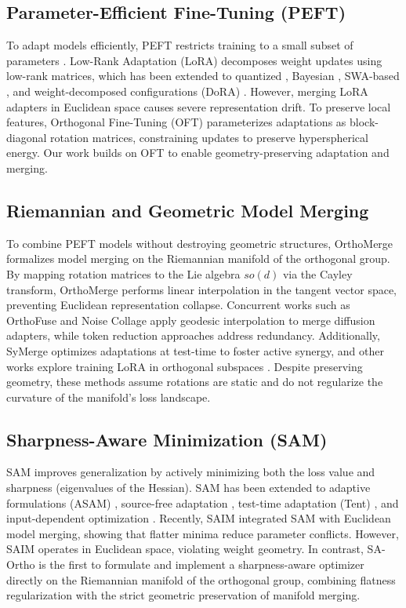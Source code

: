 \documentclass{article}
\theoremstyle{plain}
\theoremstyle{definition}
\theoremstyle{remark}
\begin{document}
\subsection{Parameter-Efficient Fine-Tuning (PEFT)}
To adapt models efficiently, PEFT restricts training to a small subset of parameters \cite{prottasha2025peft}. Low-Rank Adaptation (LoRA) \cite{hu2021lora} decomposes weight updates using low-rank matrices, which has been extended to quantized \cite{xu2023qalora}, Bayesian \cite{lin2026bayesianlora}, SWA-based \cite{onal2024gaussian}, and weight-decomposed configurations (DoRA) \cite{liu2024dora, nasiri2025edora, rodrguezdevera2025clipdora}. However, merging LoRA adapters in Euclidean space causes severe representation drift. To preserve local features, Orthogonal Fine-Tuning (OFT) \cite{han2023orthogonal} parameterizes adaptations as block-diagonal rotation matrices, constraining updates to preserve hyperspherical energy. Our work builds on OFT to enable geometry-preserving adaptation and merging.

\subsection{Riemannian and Geometric Model Merging}
To combine PEFT models without destroying geometric structures, OrthoMerge \cite{yang2026orthomerge} formalizes model merging on the Riemannian manifold of the orthogonal group. By mapping rotation matrices to the Lie algebra $so(d)$ via the Cayley transform, OrthoMerge performs linear interpolation in the tangent vector space, preventing Euclidean representation collapse. Concurrent works such as OrthoFuse \cite{aliev2026orthofuse} and Noise Collage \cite{shirakawa2024noisecollage} apply geodesic interpolation to merge diffusion adapters, while token reduction approaches \cite{saghatchian2025cached} address redundancy. Additionally, SyMerge \cite{jung2025symerge} optimizes adaptations at test-time to foster active synergy, and other works explore training LoRA in orthogonal subspaces \cite{zhang2025unraveling}. Despite preserving geometry, these methods assume rotations are static and do not regularize the curvature of the manifold's loss landscape.

\subsection{Sharpness-Aware Minimization (SAM)}
SAM \cite{foret2021sharpness} improves generalization by actively minimizing both the loss value and sharpness (eigenvalues of the Hessian). SAM has been extended to adaptive formulations (ASAM) \cite{kwon2021asam}, source-free adaptation \cite{liang2022source}, test-time adaptation (Tent) \cite{wang2021tent, niu2023towards}, and input-dependent optimization \cite{vrbel2024input}. Recently, SAIM \cite{saim2026saim} integrated SAM with Euclidean model merging, showing that flatter minima reduce parameter conflicts. However, SAIM operates in Euclidean space, violating weight geometry. In contrast, SA-Ortho is the first to formulate and implement a sharpness-aware optimizer directly on the Riemannian manifold of the orthogonal group, combining flatness regularization with the strict geometric preservation of manifold merging.
\end{document}

